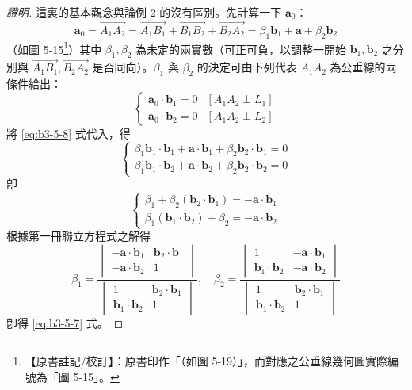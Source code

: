 \begin{proof}[證明]
這裏的基本觀念與論例 2 的沒有區別。先計算一下 $\mathbf{a}_0$：
\begin{equation}
\mathbf{a}_0 = \vec{A_1A_2} = \vec{A_1B_1} + \vec{B_1B_2} + \vec{B_2A_2} = \beta_1 \mathbf{b}_1 + \mathbf{a} + \beta_2 \mathbf{b}_2 \label{eq:b3-5-8}
\end{equation}
（如圖 5-15\label{note:b3-ch5-p240-fig-ref}\footnote{【原書註記/校訂】：原書印作「（如圖 5-19）」，而對應之公垂線幾何圖實際編號為「圖 5-15」。}）其中 $\beta_1, \beta_2$ 為未定的兩實數（可正可負，以調整一開始 $\mathbf{b}_1, \mathbf{b}_2$ 之分別與 $\vec{A_1B_1}, \vec{B_2A_2}$ 是否同向）。$\beta_1$ 與 $\beta_2$ 的決定可由下列代表 $A_1A_2$ 為公垂線的兩條件給出：
\[ \begin{cases} \mathbf{a}_0 \cdot \mathbf{b}_1 = 0 & [A_1A_2 \perp L_1] \\ \mathbf{a}_0 \cdot \mathbf{b}_2 = 0 & [A_1A_2 \perp L_2] \end{cases} \]
將 \eqref{eq:b3-5-8} 式代入，得
\[ \begin{cases} \beta_1 \mathbf{b}_1 \cdot \mathbf{b}_1 + \mathbf{a} \cdot \mathbf{b}_1 + \beta_2 \mathbf{b}_2 \cdot \mathbf{b}_1 = 0 \\ \beta_1 \mathbf{b}_1 \cdot \mathbf{b}_2 + \mathbf{a} \cdot \mathbf{b}_2 + \beta_2 \mathbf{b}_2 \cdot \mathbf{b}_2 = 0 \end{cases} \]
卽
\[ \begin{cases} \beta_1 + \beta_2 (\mathbf{b}_2 \cdot \mathbf{b}_1) = -\mathbf{a} \cdot \mathbf{b}_1 \\ \beta_1 (\mathbf{b}_1 \cdot \mathbf{b}_2) + \beta_2 = -\mathbf{a} \cdot \mathbf{b}_2 \end{cases} \]
根據第一冊聯立方程式之解得
\[ \beta_1 = \frac{\begin{vmatrix} -\mathbf{a} \cdot \mathbf{b}_1 & \mathbf{b}_2 \cdot \mathbf{b}_1 \\ -\mathbf{a} \cdot \mathbf{b}_2 & 1 \end{vmatrix}}{\begin{vmatrix} 1 & \mathbf{b}_2 \cdot \mathbf{b}_1 \\ \mathbf{b}_1 \cdot \mathbf{b}_2 & 1 \end{vmatrix}},\quad \beta_2 = \frac{\begin{vmatrix} 1 & -\mathbf{a} \cdot \mathbf{b}_1 \\ \mathbf{b}_1 \cdot \mathbf{b}_2 & -\mathbf{a} \cdot \mathbf{b}_2 \end{vmatrix}}{\begin{vmatrix} 1 & \mathbf{b}_2 \cdot \mathbf{b}_1 \\ \mathbf{b}_1 \cdot \mathbf{b}_2 & 1 \end{vmatrix}} \]
卽得 \eqref{eq:b3-5-7} 式。
\end{proof}

